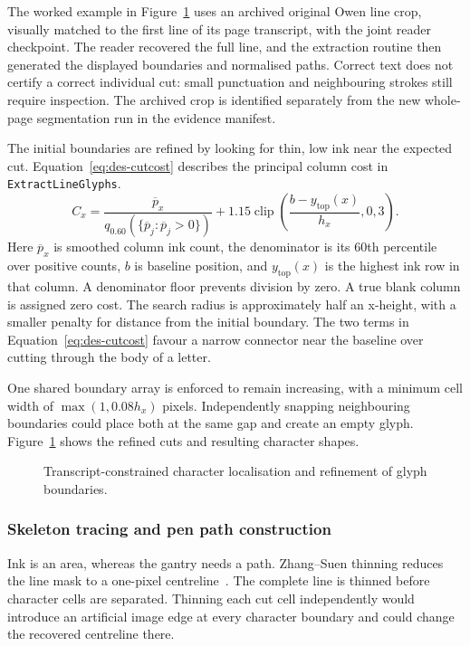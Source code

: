 The worked example in Figure~\ref{fig:des-alignment} uses an archived original Owen line crop, visually matched to the first line of its page transcript, with the joint reader checkpoint. The reader recovered the full line, and the extraction routine then generated the displayed boundaries and normalised paths. Correct text does not certify a correct individual cut: small punctuation and neighbouring strokes still require inspection. The archived crop is identified separately from the new whole-page segmentation run in the evidence manifest.

The initial boundaries are refined by looking for thin, low ink near the expected cut. Equation~\ref{eq:des-cutcost} describes the principal column cost in \texttt{ExtractLineGlyphs}.
\begin{equation}
C_x=\frac{\overline p_x}{q_{0.60}(\{\overline p_j:\overline p_j>0\})}
+1.15\operatorname{clip}\left(\frac{b-y_{\mathrm{top}}(x)}{h_x},0,3\right).
\label{eq:des-cutcost}
\end{equation}
Here $\overline p_x$ is smoothed column ink count, the denominator is its 60th percentile over positive counts, $b$ is baseline position, and $y_{\mathrm{top}}(x)$ is the highest ink row in that column. A denominator floor prevents division by zero. A true blank column is assigned zero cost. The search radius is approximately half an x-height, with a smaller penalty for distance from the initial boundary. The two terms in Equation~\ref{eq:des-cutcost} favour a narrow connector near the baseline over cutting through the body of a letter.

One shared boundary array is enforced to remain increasing, with a minimum cell width of $\max(1,0.08h_x)$ pixels. Independently snapping neighbouring boundaries could place both at the same gap and create an empty glyph. Figure~\ref{fig:des-alignment} shows the refined cuts and resulting character shapes.
\begin{figure}[!htbp]\centering
{}
\caption{Transcript-constrained character localisation and refinement of glyph boundaries.}
\label{fig:des-alignment}
\end{figure}

\subsubsection{Skeleton tracing and pen path construction}
Ink is an area, whereas the gantry needs a path. Zhang--Suen thinning reduces the line mask to a one-pixel centreline~\cite[p.~237]{zhang1984}. The complete line is thinned before character cells are separated. Thinning each cut cell independently would introduce an artificial image edge at every character boundary and could change the recovered centreline there.

